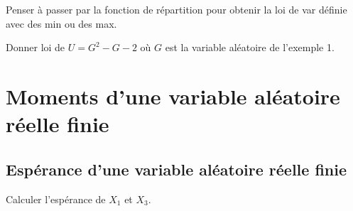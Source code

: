 \documentclass[a4paper, 11pt]{article}
\begin{document}
\vspace{14cm}



Penser \`{a} passer par la fonction de r\'epartition pour obtenir la loi de var d\'efinie avec des min ou des max.



\begin{exercice} 
Donner loi de  $U=G^2-G-2$ où $G$ est la variable aléatoire de l'exemple 1.
\end{exercice}

\vspace{3cm}



\section{Moments d'une variable al\'eatoire r\'eelle finie}

\subsection{Esp\'erance d'une variable al\'eatoire r\'eelle finie}



\begin{exemple}
Calculer l'espérance de $X_1$ et $X_3$. 
\end{exemple}



 \vspace{7cm}


 



\end{document}

